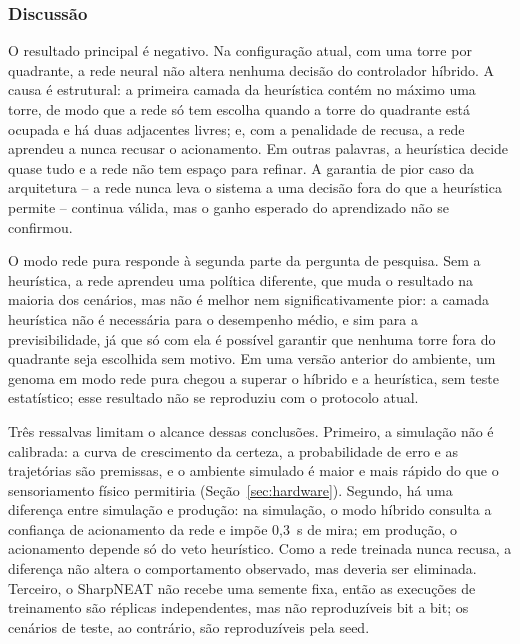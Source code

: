 \documentclass[12pt,a4paper]{article}
\begin{document}
\subsubsection{Discussão}
\label{sec:discussao}

O resultado principal é negativo. Na configuração atual, com uma torre por quadrante, a rede neural
não altera nenhuma decisão do controlador híbrido. A causa é estrutural: a primeira camada da
heurística contém no máximo uma torre, de modo que a rede só tem escolha quando a torre do quadrante
está ocupada e há duas adjacentes livres; e, com a penalidade de recusa, a rede aprendeu a nunca
recusar o acionamento. Em outras palavras, a heurística decide quase tudo e a rede não tem espaço
para refinar. A garantia de pior caso da arquitetura -- a rede nunca leva o sistema a uma decisão
fora do que a heurística permite -- continua válida, mas o ganho esperado do aprendizado não se
confirmou.

O modo rede pura responde à segunda parte da pergunta de pesquisa. Sem a heurística, a rede
aprendeu uma política diferente, que muda o resultado na maioria dos cenários, mas não é melhor nem
significativamente pior: a camada heurística não é necessária para o desempenho médio, e sim para a
previsibilidade, já que só com ela é possível garantir que nenhuma torre fora do quadrante seja
escolhida sem motivo. Em uma versão anterior do ambiente, um genoma em modo rede pura chegou a
superar o híbrido e a heurística, sem teste estatístico; esse resultado não se reproduziu com o
protocolo atual.

Três ressalvas limitam o alcance dessas conclusões. Primeiro, a simulação não é calibrada: a curva
de crescimento da certeza, a probabilidade de erro e as trajetórias são premissas, e o ambiente
simulado é maior e mais rápido do que o sensoriamento físico permitiria
(Seção~\ref{sec:hardware}). Segundo, há uma diferença entre simulação e produção: na simulação, o
modo híbrido consulta a confiança de acionamento da rede e impõe 0,3~s de mira; em produção, o
acionamento depende só do veto heurístico. Como a rede treinada nunca recusa, a diferença não altera
o comportamento observado, mas deveria ser eliminada. Terceiro, o SharpNEAT não recebe uma semente
fixa, então as execuções de treinamento são réplicas independentes, mas não reproduzíveis bit a bit;
os cenários de teste, ao contrário, são reproduzíveis pela seed.

\end{document}
